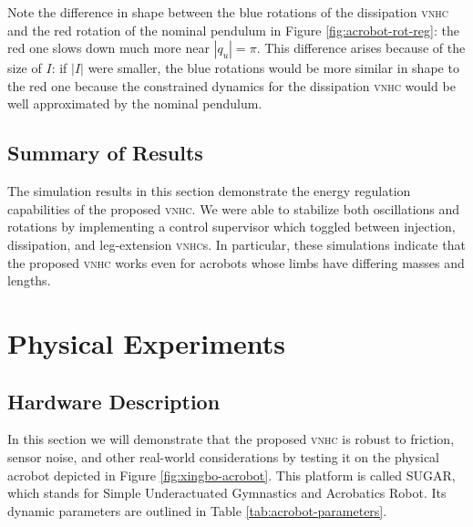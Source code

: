 \documentclass[journal,twoside,web, twocolumn]{ieeecolor}
\newcommand*{\vnhc}{\textsc{vnhc}\xspace}
\newcommand*{\vnhcs}{\textsc{vnhc}s\xspace}
\begin{document}
Note the difference in shape between the blue rotations of the dissipation \vnhc
and the red rotation of the nominal pendulum in Figure
\ref{fig:acrobot-rot-reg}: the red one slows down much more
near \(|q_u| = \pi\).
This difference arises because of the size of \(I\):
if \(|I|\) were smaller, the blue rotations would be more similar in shape to the
red one because the constrained dynamics for the dissipation \vnhc would be
well approximated by the nominal pendulum.

\subsection{Summary of Results}
The simulation results in this section demonstrate the energy regulation
capabilities of the proposed \vnhc.  
We were able to stabilize both oscillations and rotations by implementing a
control supervisor which toggled between injection, dissipation, and
leg-extension \vnhcs.
In particular, these simulations indicate that the proposed \vnhc
works even for acrobots whose limbs have differing masses and lengths.

\section{Physical Experiments}\label{sec:experiments}

\subsection{Hardware Description}
In this section we will demonstrate that the proposed \vnhc is robust to friction, sensor
noise, and other real-world considerations by testing it on the physical
acrobot depicted in Figure \ref{fig:xingbo-acrobot}.
This platform is called SUGAR, which stands for
Simple Underactuated Gymnastics and Acrobatics Robot.
Its dynamic parameters are outlined in Table \ref{tab:acrobot-parameters}.
\end{document}
